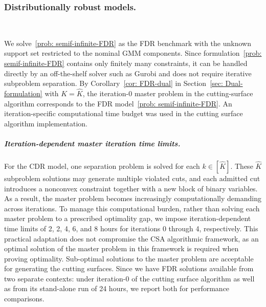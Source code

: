 \documentclass[opre,sglanonrev]{informs4}
\newcommand{\mS}{\mathcal{S}}
\newcommand{\bs}{\bm{s}}
\begin{document}
{\subsubsection{Distributionally robust models. }\,
\label{sec:approaches_cont}

We solve~\eqref{prob: semif-infinite-FDR} as the FDR benchmark with the unknown support set restricted to the nominal GMM components. Since formulation~\eqref{prob: semif-infinite-FDR} contains only finitely many constraints, it can be handled directly by an off-the-shelf solver such as Gurobi and does not require iterative subproblem separation. %
By Corollary~\ref{cor: FDR-dual} in Section~\ref{sec: Dual-formulation} with $K = \hat{K}$, the iteration-0 master problem in the cutting-surface algorithm corresponds to the FDR model~\eqref{prob: semif-infinite-FDR}. An iteration-specific computational time budget was used in the cutting surface algorithm implementation.

\subparagraph{Iteration-dependent master iteration time limits.}

For the CDR model, one separation problem is solved for each \(k\in[\hat K]\). These \(\hat K\) subproblem solutions may generate multiple violated cuts, and each admitted cut introduces a nonconvex constraint together with a new block of binary variables. As a result, the master problem becomes increasingly computationally demanding across iterations. To manage this computational burden, rather than solving each master problem to a prescribed optimality gap, we impose iteration-dependent time limits of 2, 2, 4, 6, and 8 hours for iterations 0 through 4, respectively. This practical adaptation does not compromise the CSA algorithmic framework, as an optimal solution of the master problem in this framework is required when proving optimality. Sub-optimal solutions to the master problem are acceptable for generating the cutting surfaces. Since we have FDR solutions available from two separate contexts: under iteration-0 of the cutting surface algorithm as well as from its stand-alone run of 24 hours, we report both for performance comparisons.

}
\end{document}
